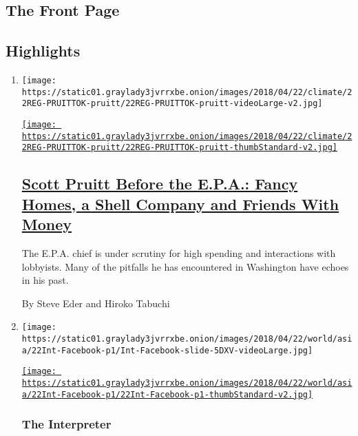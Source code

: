 \hypertarget{the-front-page}{%
\subsection{The Front Page}\label{the-front-page}}

\hypertarget{highlights}{%
\subsection{Highlights}\label{highlights}}

\begin{enumerate}
\def\labelenumi{\arabic{enumi}.}
\item
  \texttt{[image: https://static01.graylady3jvrrxbe.onion/images/2018/04/22/climate/22REG-PRUITTOK-pruitt/22REG-PRUITTOK-pruitt-videoLarge-v2.jpg]}

  \href{/2018/04/21/us/politics/scott-pruitt-oklahoma-epa.html}{\texttt{[image: https://static01.graylady3jvrrxbe.onion/images/2018/04/22/climate/22REG-PRUITTOK-pruitt/22REG-PRUITTOK-pruitt-thumbStandard-v2.jpg]}}

  \hypertarget{scott-pruitt-before-the-epa-fancy-homes-a-shell-company-and-friends-with-money}{%
  \subsection{\texorpdfstring{\href{/2018/04/21/us/politics/scott-pruitt-oklahoma-epa.html}{Scott
  Pruitt Before the E.P.A.: Fancy Homes, a Shell Company and Friends
  With
  Money}}{Scott Pruitt Before the E.P.A.: Fancy Homes, a Shell Company and Friends With Money}}\label{scott-pruitt-before-the-epa-fancy-homes-a-shell-company-and-friends-with-money}}

  The E.P.A. chief is under scrutiny for high spending and interactions
  with lobbyists. Many of the pitfalls he has encountered in Washington
  have echoes in his past.

  By Steve Eder and Hiroko Tabuchi
\item
  \texttt{[image: https://static01.graylady3jvrrxbe.onion/images/2018/04/22/world/asia/22Int-Facebook-p1/Int-Facebook-slide-5DXV-videoLarge.jpg]}

  \href{/2018/04/21/world/asia/facebook-sri-lanka-riots.html}{\texttt{[image: https://static01.graylady3jvrrxbe.onion/images/2018/04/22/world/asia/22Int-Facebook-p1/22Int-Facebook-p1-thumbStandard-v2.jpg]}}

  \hypertarget{the-interpreter}{%
  \subsubsection{The Interpreter}\label{the-interpreter}}


\end{enumerate}
